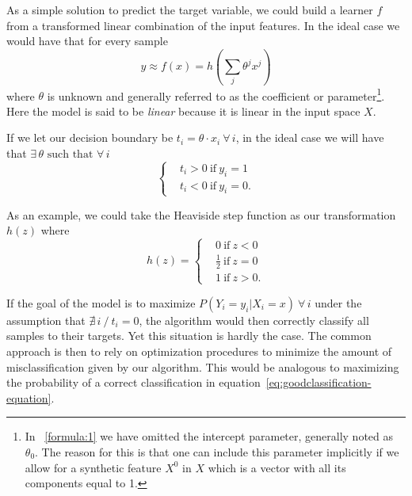 As a simple solution to predict the target variable, we could build a learner $f$ from a transformed linear combination of the input features.
In the ideal case we would have that for every sample
\begin{equation}
y \approx f(x) = h\left(\sum_{j}\theta^j x^j\right)  \label{formula:1}
\end{equation}
where $\theta$ is unknown and generally referred to as the coefficient or parameter\footnote{In ~\cref{formula:1} we have omitted the intercept parameter, generally noted as $\theta_0$.
The reason for this is that one can include this parameter implicitly if we allow for a synthetic feature $X^0$ in $X$ which is a vector with all its components equal to 1.}.
Here the model is said to be \textit{linear} because it is linear in the input space $X$.

If we let our decision boundary be $ t_i = \theta \cdot x_i \ \forall \, i $, in the ideal case we will have that $\exists \, \theta \mbox{ such that } \forall \, i $
\begin{equation}
\begin{cases}
& t_i >0 \ \mbox{if} \ y_i=1 \\
& t_i <0 \ \mbox{if} \ y_i=0.
\end{cases}
\end{equation}

As an example, we could take the Heaviside step function as our transformation $h(z)$ where
\begin{equation}
h(z) =
\begin{cases}
&0 \ \mbox{if} \ z<0 \\
&\frac{1}{2} \ \mbox{if} \ z=0 \\
&1 \ \mbox{if} \ z>0.
\end{cases}
\end{equation}

If the goal of the model is to maximize $P(Y_i = y_i | X_i = x) \ \forall \, i$
under the assumption that $\nexists\, i \ / \ t_i = 0$, the algorithm would then correctly classify all samples to their targets.
Yet this situation is hardly the case.
The common approach is then to rely on optimization procedures to minimize the amount of misclassification given by our algorithm.
This would be analogous to maximizing the probability of a correct classification in equation~\eqref{eq:goodclassification-equation}.


